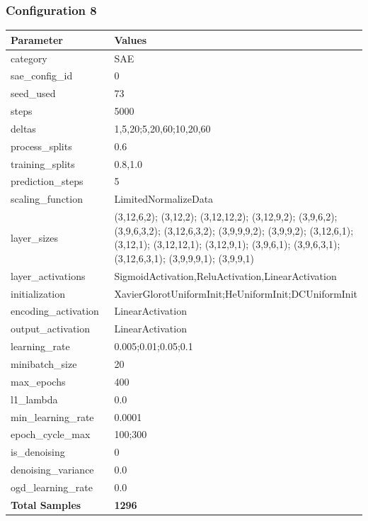 \documentclass[a4paper,11pt,oneside]{article}
\theoremstyle{plain}
\theoremstyle{definition}
\begin{document}
	\newpage
	\subsubsection{Configuration 8}\label{config8}
	\begin{longtable}[H]{|p{0.3\linewidth}|p{0.7\linewidth}|} \hline 			\rowcolor{beaublue}\textbf{Parameter} &\textbf{Values} \\\hline{category} & {SAE} \\\hline
		{sae\_config\_id} & {0} \\\hline
		{seed\_used} & {73} \\\hline
		{steps} & {5000} \\\hline
		{deltas} & {1,5,20;5,20,60;10,20,60} \\\hline
		{process\_splits} & {0.6} \\\hline
		{training\_splits} & {0.8,1.0} \\\hline
		{prediction\_steps} & {5} \\\hline
		{scaling\_function} & {LimitedNormalizeData} \\\hline
		{layer\_sizes} & {(3,12,6,2); (3,12,2); (3,12,12,2); (3,12,9,2); (3,9,6,2); (3,9,6,3,2); (3,12,6,3,2); (3,9,9,9,2); (3,9,9,2); (3,12,6,1); (3,12,1); (3,12,12,1); (3,12,9,1); (3,9,6,1); (3,9,6,3,1); (3,12,6,3,1); (3,9,9,9,1); (3,9,9,1)} \\\hline
		{layer\_activations} & {SigmoidActivation,ReluActivation,LinearActivation} \\\hline
		{initialization} & {XavierGlorotUniformInit;HeUniformInit;DCUniformInit} \\\hline
		{encoding\_activation} & {LinearActivation} \\\hline
		{output\_activation} & {LinearActivation} \\\hline
		{learning\_rate} & {0.005;0.01;0.05;0.1} \\\hline
		{minibatch\_size} & {20} \\\hline
		{max\_epochs} & {400} \\\hline
		{l1\_lambda} & {0.0} \\\hline
		{min\_learning\_rate} & {0.0001} \\\hline
		{epoch\_cycle\_max} & {100;300} \\\hline
		{is\_denoising} & {0} \\\hline
		{denoising\_variance} & {0.0} \\\hline
		{ogd\_learning\_rate} & {0.0} \\\hline
		{\textbf{Total Samples}} & {\textbf{1296}} \\\hline
	\end{longtable}
	
\end{document}

